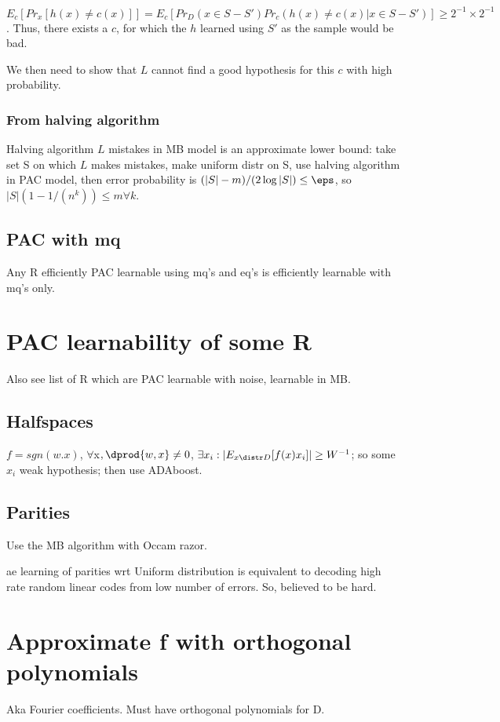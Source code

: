 \documentclass[oneside, article]{memoir}
\begin{document}
$E_{c}[Pr_x[h(x) \neq c(x)]] = E_c[Pr_{D}(x \in S-S') Pr_{c}(h(x) \neq c(x)|x \in S-S')] \geq 2^{-1}\times 2^{-1}$. Thus, there exists a $c$, for which the $h$ learned using $S'$ as the sample would be bad.

We then need to show that $L$ cannot find a good hypothesis for this $c$ with high probability. \tbc

\subsubsection{From halving algorithm}
Halving algorithm $L$ mistakes in MB model is an approximate lower bound: take set S on which $L$ makes mistakes, make uniform distr on S, use halving algorithm in PAC model, then error probability is $(|S| - m)/(2 \log |S|) \leq \eps$, so $|S|(1 - 1/(n^{k})) \leq m \forall k$.

\subsection{PAC with mq}
Any R efficiently PAC learnable using mq's and eq's is efficiently learnable with mq's only.

\section{PAC learnability of some R}
Also see list of R which are PAC learnable with noise, learnable in MB.

\subsection{Halfspaces}
$f=sgn(w.x)$, $\forall $x$, \dprod{w,x} \neq 0$, $\exists x_{i}: |E_{x\distr D}[f(x)x_{i}]|\geq W^{-1}$; so some $x_{i}$ weak hypothesis; then use ADAboost.

\subsection{Parities}
Use the MB algorithm with Occam razor.

ae learning of parities wrt Uniform distribution is equivalent to decoding high rate random linear codes from low number of errors. So, believed to be hard.

\section{Approximate f with orthogonal polynomials}
Aka Fourier coefficients. Must have orthogonal polynomials for D.
\end{document}
